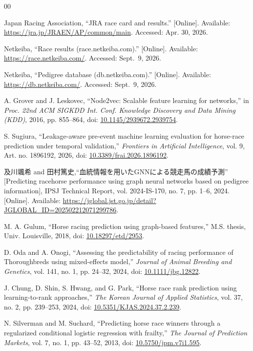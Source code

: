\begin{thebibliography}{00}

Japan Racing Association, ``JRA race card and results.'' [Online]. Available: \url{https://jra.jp/JRAEN/AP/common/main}. Accessed: Apr. 30, 2026.

Netkeiba, ``Race results (race.netkeiba.com).'' [Online]. Available: \url{https://race.netkeiba.com/}. Accessed: Sept.~9, 2026.

Netkeiba, ``Pedigree database (db.netkeiba.com).'' [Online]. Available: \url{https://db.netkeiba.com/}. Accessed: Sept.~9, 2026.

A. Grover and J. Leskovec, ``Node2vec: Scalable feature learning for networks,'' in \emph{Proc. 22nd ACM SIGKDD Int. Conf. Knowledge Discovery and Data Mining (KDD)}, 2016, pp. 855--864, doi: \url{10.1145/2939672.2939754}.

S. Sugiura, ``Leakage-aware pre-event machine learning evaluation for horse-race prediction under temporal validation,'' \emph{Frontiers in Artificial Intelligence}, vol. 9, Art. no. 1896192, 2026, doi: \url{10.3389/frai.2026.1896192}.

{\japanesefont 及川颯希} and {\japanesefont 田村篤史},\newline ``{\japanesefont 血統情報を用いたGNNによる競走馬の成績予測}'' [Predicting racehorse performance using graph neural networks based on pedigree information], IPSJ Technical Report, vol. 2024-IS-170, no. 7, pp. 1--6, 2024. [Online]. Available: \url{https://jglobal.jst.go.jp/detail?JGLOBAL_ID=202502212071299786}.

M. A. Gulum, ``Horse racing prediction using graph-based features,'' M.S. thesis, Univ. Louisville, 2018, doi: \url{10.18297/etd/2953}.

D. Oda and A. Onogi, ``Assessing the predictability of racing performance of Thoroughbreds using mixed-effects model,'' \emph{Journal of Animal Breeding and Genetics}, vol. 141, no. 1, pp. 24--32, 2024, doi: \url{10.1111/jbg.12822}.

J. Chung, D. Shin, S. Hwang, and G. Park, ``Horse race rank prediction using learning-to-rank approaches,'' \emph{The Korean Journal of Applied Statistics}, vol. 37, no. 2, pp. 239--253, 2024, doi: \url{10.5351/KJAS.2024.37.2.239}.

N. Silverman and M. Suchard, ``Predicting horse race winners through a regularized conditional logistic regression with frailty,'' \emph{The Journal of Prediction Markets}, vol. 7, no. 1, pp. 43--52, 2013, doi: \url{10.5750/jpm.v7i1.595}.


\end{thebibliography}
